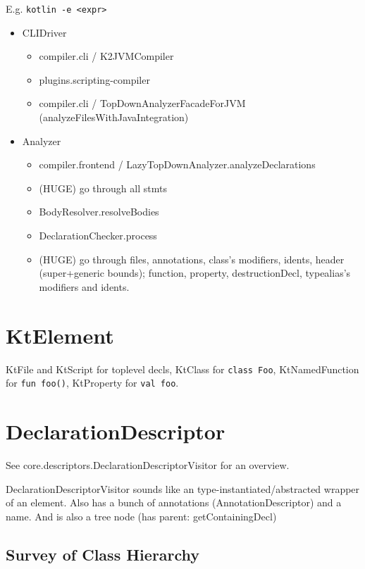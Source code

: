 \documentclass{article}
\begin{document}
E.g. \texttt{kotlin -e <expr>}

\begin{itemize}
    \item CLIDriver
    \begin{itemize}
        \item compiler.cli / K2JVMCompiler
        \item plugins.scripting-compiler
        \item compiler.cli / TopDownAnalyzerFacadeForJVM (analyzeFilesWithJavaIntegration)
    \end{itemize}
    \item Analyzer
    \begin{itemize}
        \item compiler.frontend / LazyTopDownAnalyzer.analyzeDeclarations
        \item (HUGE) go through all stmts
        \item BodyResolver.resolveBodies
        \item DeclarationChecker.process
        \item (HUGE) go through files, annotations, class's modifiers, idents, header (super+generic bounds); function, property, destructionDecl, typealias's modifiers and idents.
    \end{itemize}
\end{itemize}

\section{KtElement}

KtFile and KtScript for toplevel decls,
KtClass for \texttt{class Foo}, KtNamedFunction for \texttt{fun foo()}, KtProperty for \texttt{val foo}.

\section{DeclarationDescriptor}
\label{sec:descriptor}

See core.descriptors.DeclarationDescriptorVisitor for an overview.

DeclarationDescriptorVisitor sounds like an type-instantiated/abstracted wrapper of an element. Also has a bunch of annotations (AnnotationDescriptor) and a name. And is also a tree node (has parent: getContainingDecl)

\subsection{Survey of Class Hierarchy}
\end{document}
